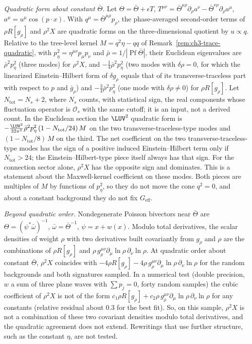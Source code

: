 \emph{Quadratic form about constant \(\bar\Theta\).} Let
\(\Theta=\bar\Theta+\epsilon T\), \(T^{\mu\nu}
=\bar\Theta^{\mu\rho}\partial_\rho a^\nu-\bar\Theta^{\nu\rho}\partial_\rho a^\mu\),
\(a^\mu=u^\mu\cos(p\cdot x)\). With \(q^\mu=\bar\Theta^{\mu\rho}p_\rho\),
the phase-averaged second-order terms of \(\rho R[g_\rho]\) and
\(\rho^2X\) are quadratic forms on the three-dimensional quotient by
\(u\propto q\). Relative to the tree-level kernel
\(M=q^2\eta-qq\) of Remark~\ref{rem:ch3-trace-quadratic}, with
\(p_\eta^2=\eta^{\mu\nu}p_\mu p_\nu\) and
\(\bar\rho=1/|\operatorname{Pf}\bar\Theta|\), their Euclidean
eigenvalues are
\(\bar\rho^{2}p_\eta^2\) (three modes) for \(\rho^2X\), and
\(-\tfrac14\bar\rho^{2}p_\eta^2\) (two modes with \(\delta\rho=0\), for
which the linearized Einstein--Hilbert form of \(\delta g_\rho\) equals
that of its transverse-traceless part with respect to \(p\) and
\(\bar g_\rho\)) and \(-\tfrac34\bar\rho^{2}p_\eta^2\) (one mode with
\(\delta\rho\ne0\)) for \(\rho R[g_\rho]\). Let
\(N_{\mathrm{tot}}=N_s+2\), where \(N_s\) counts, with statistical
sign, the real components whose fluctuation operator is
\(\mathcal O_s\) with the same cutoff; it is an input, not a derived
count. In the Euclidean section the \(\LUV^2\) quadratic form is
\(-\tfrac{\LUV^2}{32\pi^2}\bar\rho^{2}p_\eta^2\,
(1-N_{\mathrm{tot}}/24)\,M\) on the two transverse-traceless-type
modes and \((1-N_{\mathrm{tot}}/8)\,M\) on the third. The net
coefficient on the two transverse-traceless-type modes has the sign of
a positive induced Einstein--Hilbert term only if
\(N_{\mathrm{tot}}>24\); the Einstein--Hilbert-type piece itself always
has that sign. For the connection sector alone, \(\rho^2X\) has the
opposite sign and dominates. This is a statement about the
Maxwell-kernel coefficient on these modes. Both pieces are multiples of
\(M\) by functions of \(p_\eta^2\), so they do not move the cone
\(q^2=0\), and about a constant background they do not fix
\(G_{\mathrm{eff}}\).

\emph{Beyond quadratic order.} Nondegenerate Poisson bivectors near
\(\bar\Theta\) are \(\Theta=(\psi^*\bar\omega)^{-1}\),
\(\bar\omega=\bar\Theta^{-1}\), \(\psi=x+w(x)\). Modulo total
derivatives, the scalar densities of weight \(\rho\) with two
derivatives built covariantly from \(g_\rho\) and \(\rho\) are the
combinations of \(\rho R[g_\rho]\) and
\(\rho\,g_\rho^{\mu\nu}\partial_\mu\ln\rho\,\partial_\nu\ln\rho\). At
quadratic order about constant \(\bar\Theta\), \(\rho^2X\) coincides
with \(-4\rho R[g_\rho]-4\rho\,g_\rho^{\mu\nu}\partial_\mu\ln\rho\,
\partial_\nu\ln\rho\) for the random backgrounds and both signatures
sampled. In a numerical test (double precision, \(w\) a sum of three
plane waves with \(\sum p_j=0\), forty random samples) the cubic
coefficient of \(\rho^2X\) is not of the form
\(c_1\rho R[g_\rho]+c_2\rho\,g_\rho^{\mu\nu}\partial_\mu\ln\rho\,
\partial_\nu\ln\rho\) for any constants (relative residual about
\(0.3\) for the best fit). So, on this sample, \(\rho^2X\) is not a
combination of these two covariant densities modulo total derivatives,
and the quadratic agreement does not extend. Rewritings that use
further structure, such as the constant \(\eta\), are not tested.

